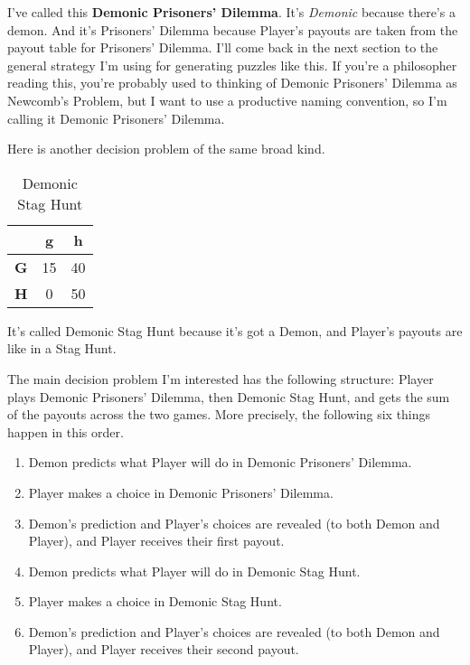 \documentclass[
  12pt,
]{article}
\providecommand{\tightlist}{%
  \setlength{\itemsep}{0pt}\setlength{\parskip}{0pt}}
\begin{document}
I've called this \textbf{Demonic Prisoners' Dilemma}. It's
\emph{Demonic} because there's a demon. And it's Prisoners' Dilemma
because Player's payouts are taken from the payout table for Prisoners'
Dilemma. I'll come back in the next section to the general strategy I'm
using for generating puzzles like this. If you're a philosopher reading
this, you're probably used to thinking of Demonic Prisoners' Dilemma as
Newcomb's Problem, but I want to use a productive naming convention, so
I'm calling it Demonic Prisoners' Dilemma.

Here is another decision problem of the same broad kind.

\begin{table}[H]

\caption{\label{tab:unnamed-chunk-3}Demonic Stag Hunt}
\centering
\begin{tabular}[t]{>{}r|cc}

\textbf{} & \textbf{g} & \textbf{h}\\
\midrule
\textbf{G} & 15 & 40\\
\textbf{H} & 0 & 50\\

\end{tabular}
\end{table}

It's called Demonic Stag Hunt because it's got a Demon, and Player's
payouts are like in a Stag Hunt.

The main decision problem I'm interested has the following structure:
Player plays Demonic Prisoners' Dilemma, then Demonic Stag Hunt, and
gets the sum of the payouts across the two games. More precisely, the
following six things happen in this order.

\begin{enumerate}
\def\labelenumi{\arabic{enumi}.}
\tightlist
\item
  Demon predicts what Player will do in Demonic Prisoners' Dilemma.
\item
  Player makes a choice in Demonic Prisoners' Dilemma.
\item
  Demon's prediction and Player's choices are revealed (to both Demon
  and Player), and Player receives their first payout.
\item
  Demon predicts what Player will do in Demonic Stag Hunt.
\item
  Player makes a choice in Demonic Stag Hunt.
\item
  Demon's prediction and Player's choices are revealed (to both Demon
  and Player), and Player receives their second payout.
\end{enumerate}
\end{document}
